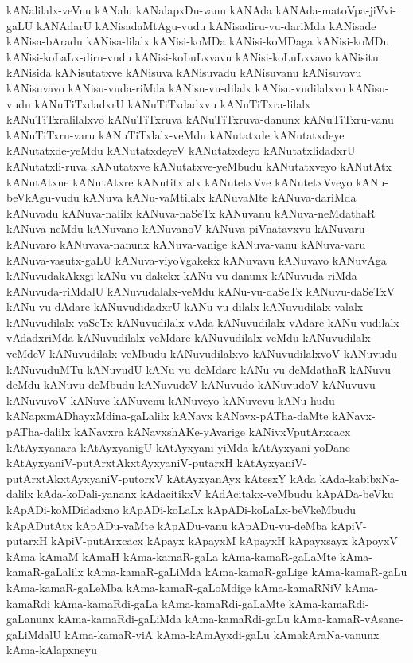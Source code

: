 {kANalilalx-veVnu
kANalu
kANalapxDu-vanu
kANAda
kANAda-matoVpa-jiVvi-gaLU
kANAdarU
kANisadaMtAgu-vudu
kANisadiru-vu-dariMda
kANisade
kANisa-bAradu
kANisa-lilalx
kANisi-koMDa
kANisi-koMDaga
kANisi-koMDu
kANisi-koLaLx-diru-vudu
kANisi-koLuLxvavu
kANisi-koLuLxvavo
kANisitu
kANisida
kANisutatxve
kANisuva
kANisuvadu
kANisuvanu
kANisuvavu
kANisuvavo
kANisu-vuda-riMda
kANisu-vu-dilalx
kANisu-vudilalxvo
kANisu-vudu
kANuTiTxdadxrU
kANuTiTxdadxvu
kANuTiTxra-lilalx
kANuTiTxralilalxvo
kANuTiTxruva
kANuTiTxruva-danunx
kANuTiTxru-vanu
kANuTiTxru-varu
kANuTiTxlalx-veMdu
kANutatxde
kANutatxdeye
kANutatxde-yeMdu
kANutatxdeyeV
kANutatxdeyo
kANutatxlidadxrU
kANutatxli-ruva
kANutatxve
kANutatxve-yeMbudu
kANutatxveyo
kANutAtx
kANutAtxne
kANutAtxre
kANutitxlalx
kANutetxVve
kANutetxVveyo
kANu-beVkAgu-vudu
kANuva
kANu-vaMtilalx
kANuvaMte
kANuva-dariMda
kANuvadu
kANuva-nalilx
kANuva-naSeTx
kANuvanu
kANuva-neMdathaR
kANuva-neMdu
kANuvano
kANuvanoV
kANuva-piVnatavxvu
kANuvaru
kANuvaro
kANuvava-nanunx
kANuva-vanige
kANuva-vanu
kANuva-varu
kANuva-vasutx-gaLU
kANuva-viyoVgakekx
kANuvavu
kANuvavo
kANuvAga
kANuvudakAkxgi
kANu-vu-dakekx
kANu-vu-danunx
kANuvuda-riMda
kANuvuda-riMdalU
kANuvudalalx-veMdu
kANu-vu-daSeTx
kANuvu-daSeTxV
kANu-vu-dAdare
kANuvudidadxrU
kANu-vu-dilalx
kANuvudilalx-valalx
kANuvudilalx-vaSeTx
kANuvudilalx-vAda
kANuvudilalx-vAdare
kANu-vudilalx-vAdadxriMda
kANuvudilalx-veMdare
kANuvudilalx-veMdu
kANuvudilalx-veMdeV
kANuvudilalx-veMbudu
kANuvudilalxvo
kANuvudilalxvoV
kANuvudu
kANuvuduMTu
kANuvudU
kANu-vu-deMdare
kANu-vu-deMdathaR
kANuvu-deMdu
kANuvu-deMbudu
kANuvudeV
kANuvudo
kANuvudoV
kANuvuvu
kANuvuvoV
kANuve
kANuvenu
kANuveyo
kANuvevu
kANu-hudu
kANapxmADhayxMdina-gaLalilx
kANavx
kANavx-pATha-daMte
kANavx-pATha-dalilx
kANavxra
kANavxshAKe-yAvarige
kANivxVputArxcacx
kAtAyxyanara
kAtAyxyanigU
kAtAyxyani-yiMda
kAtAyxyani-yoDane
kAtAyxyaniV-putArxtAkxtAyxyaniV-putarxH
kAtAyxyaniV-putArxtAkxtAyxyaniV-putorxV
kAtAyxyanAyx
kAtesxY
kAda
kAda-kabibxNa-dalilx
kAda-koDali-yananx
kAdacitikxV
kAdAcitakx-veMbudu
kApADa-beVku
kApADi-koMDidadxno
kApADi-koLaLx
kApADi-koLaLx-beVkeMbudu
kApADutAtx
kApADu-vaMte
kApADu-vanu
kApADu-vu-deMba
kApiV-putarxH
kApiV-putArxcacx
kApayx
kApayxM
kApayxH
kApayxsayx
kApoyxV
kAma
kAmaM
kAmaH
kAma-kamaR-gaLa
kAma-kamaR-gaLaMte
kAma-kamaR-gaLalilx
kAma-kamaR-gaLiMda
kAma-kamaR-gaLige
kAma-kamaR-gaLu
kAma-kamaR-gaLeMba
kAma-kamaR-gaLoMdige
kAma-kamaRNiV
kAma-kamaRdi
kAma-kamaRdi-gaLa
kAma-kamaRdi-gaLaMte
kAma-kamaRdi-gaLanunx
kAma-kamaRdi-gaLiMda
kAma-kamaRdi-gaLu
kAma-kamaR-vAsane-gaLiMdalU
kAma-kamaR-viA
kAma-kAmAyxdi-gaLu
kAmakAraNa-vanunx
kAma-kAlapxneyu
}
